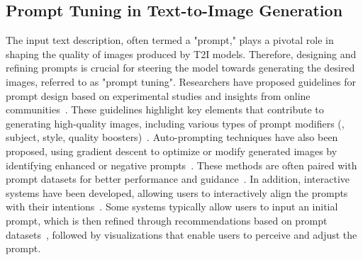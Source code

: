 \subsection{Prompt Tuning in Text-to-Image Generation}
The input text description, often termed a "prompt," plays a pivotal role in shaping the quality of images produced by T2I models. 
Therefore, designing and refining prompts is crucial for steering the model towards generating the desired images, referred to as "prompt tuning".
Researchers have proposed guidelines for prompt design based on experimental studies and insights from online communities~\cite{wang2022diffusiondb}. 
These guidelines highlight key elements that contribute to generating high-quality images, including various types of prompt modifiers (\eg, subject, style, quality boosters)~\cite{oppenlaender2023prompting,oppenlaender2023taxonomy,liu2022design}. 
Auto-prompting techniques have also been proposed, using gradient descent to optimize or modify generated images by identifying enhanced or negative prompts~\cite{wang2024discrete, pryzant2023automatic, guo2023connecting}.
These methods are often paired with prompt datasets for better performance and guidance~\cite{cao2023beautifulprompt,hao2024optimizing}.
In addition, interactive systems have been developed, allowing users to interactively align the prompts with their intentions~\cite{guo2024prompthis,brade2023promptify,wang2024promptcharm,feng2023promptmagician,promptpaint,zeng_2024_intent}. 
Some systems typically allow users to input an initial prompt, which is then refined through recommendations based on prompt datasets~\cite{wang2022diffusiondb}, followed by visualizations that enable users to perceive and adjust the prompt.

